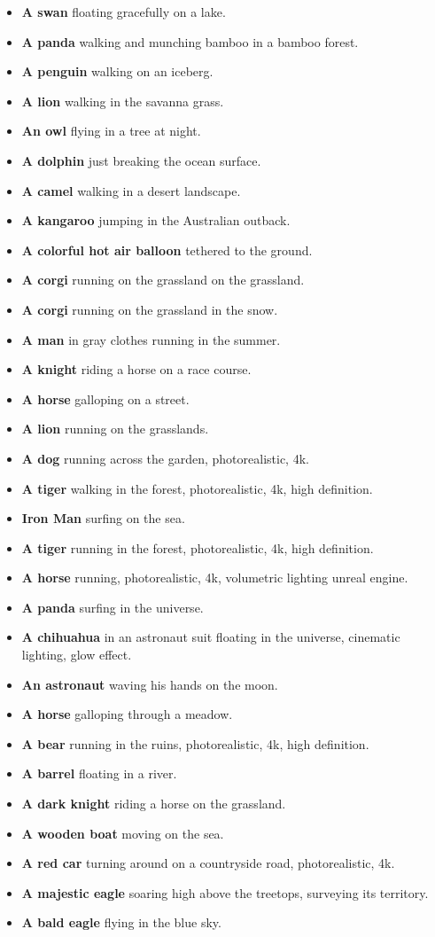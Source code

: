 \begin{itemize}
    \item \textbf{A swan} floating gracefully on a lake.
    \item \textbf{A panda} walking and munching bamboo in a bamboo forest.
    \item \textbf{A penguin} walking on an iceberg.
    \item \textbf{A lion} walking in the savanna grass.
    \item \textbf{An owl} flying in a tree at night.
    \item \textbf{A dolphin} just breaking the ocean surface.
    \item \textbf{A camel} walking in a desert landscape.
    \item \textbf{A kangaroo} jumping in the Australian outback.
    \item \textbf{A colorful hot air balloon} tethered to the ground.
    \item \textbf{A corgi} running on the grassland on the grassland.
    \item \textbf{A corgi} running on the grassland in the snow.
    \item \textbf{A man} in gray clothes running in the summer.
    \item \textbf{A knight} riding a horse on a race course.
    \item \textbf{A horse} galloping on a street.
    \item \textbf{A lion} running on the grasslands.
    \item \textbf{A dog} running across the garden, photorealistic, 4k.
    \item \textbf{A tiger} walking in the forest, photorealistic, 4k, high definition.
    \item \textbf{Iron Man} surfing on the sea.
    \item \textbf{A tiger} running in the forest, photorealistic, 4k, high definition.
    \item \textbf{A horse} running, photorealistic, 4k, volumetric lighting unreal engine.
    \item \textbf{A panda} surfing in the universe.
    \item \textbf{A chihuahua} in an astronaut suit floating in the universe, cinematic lighting, glow effect.
    \item \textbf{An astronaut} waving his hands on the moon.
    \item \textbf{A horse} galloping through a meadow.
    \item \textbf{A bear} running in the ruins, photorealistic, 4k, high definition.
    \item \textbf{A barrel} floating in a river.
    \item \textbf{A dark knight} riding a horse on the grassland.
    \item \textbf{A wooden boat} moving on the sea.
    \item \textbf{A red car} turning around on a countryside road, photorealistic, 4k.
    \item \textbf{A majestic eagle} soaring high above the treetops, surveying its territory.
    \item \textbf{A bald eagle} flying in the blue sky.
    

\end{itemize}
